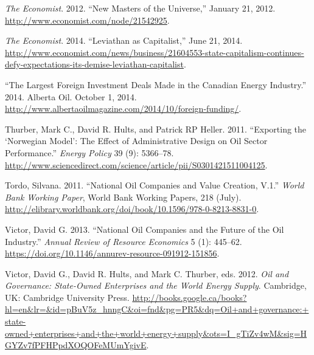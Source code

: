 \documentclass[11pt,]{book}
\begin{document}
\leavevmode\hypertarget{ref-noauthor_new_2012}{}%
\emph{The Economist}. 2012. ``New Masters of the Universe,'' January 21, 2012. \url{http://www.economist.com/node/21542925}.

\leavevmode\hypertarget{ref-noauthor_leviathan_2014}{}%
\emph{The Economist}. 2014. ``Leviathan as Capitalist,'' June 21, 2014. \url{http://www.economist.com/news/business/21604553-state-capitalism-continues-defy-expectations-its-demise-leviathan-capitalist}.

\leavevmode\hypertarget{ref-noauthor_largest_2014}{}%
``The Largest Foreign Investment Deals Made in the Canadian Energy Industry.'' 2014. Alberta Oil. October 1, 2014. \url{http://www.albertaoilmagazine.com/2014/10/foreign-funding/}.

\leavevmode\hypertarget{ref-thurber_exporting_2011}{}%
Thurber, Mark C., David R. Hults, and Patrick RP Heller. 2011. ``Exporting the `Norwegian Model': The Effect of Administrative Design on Oil Sector Performance.'' \emph{Energy Policy} 39 (9): 5366--78. \url{http://www.sciencedirect.com/science/article/pii/S0301421511004125}.

\leavevmode\hypertarget{ref-tordo_national_2011}{}%
Tordo, Silvana. 2011. ``National Oil Companies and Value Creation, V.1.'' \emph{World Bank Working Paper}, World Bank Working Papers, 218 (July). \url{http://elibrary.worldbank.org/doi/book/10.1596/978-0-8213-8831-0}.

\leavevmode\hypertarget{ref-victor_national_2013}{}%
Victor, David G. 2013. ``National Oil Companies and the Future of the Oil Industry.'' \emph{Annual Review of Resource Economics} 5 (1): 445--62. \url{https://doi.org/10.1146/annurev-resource-091912-151856}.

\leavevmode\hypertarget{ref-victor_oil_2012}{}%
Victor, David G., David R. Hults, and Mark C. Thurber, eds. 2012. \emph{Oil and Governance: State-Owned Enterprises and the World Energy Supply}. Cambridge, UK: Cambridge University Press. \url{http://books.google.ca/books?hl=en\&lr=\&id=pBuV5z_hnngC\&oi=fnd\&pg=PR5\&dq=Oil+and+governance:+state-owned+enterprises+and+the+world+energy+supply\&ots=I_gTiZv4wM\&sig=HGYZv7fPFHPpdXOQOFeMUmYgivE}.
\end{document}

